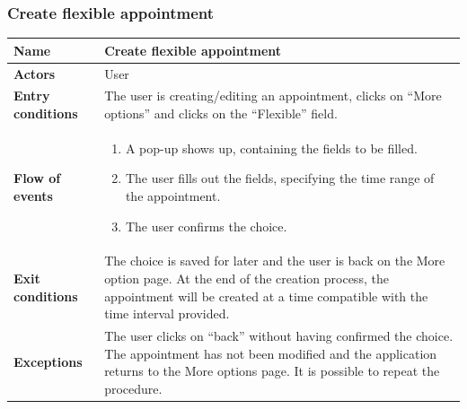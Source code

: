 \subsubsection{Create flexible appointment}
\begin{table}[!h]
	\centering
	{\renewcommand{\arraystretch}{2}%
		\begin{tabular}{|l|p{12cm}|}
			\hline
			\textbf{Name} 				& \textbf{Create flexible appointment} \\ \hline
			\textbf{Actors} 			& User \\ \hline
			\textbf{Entry conditions} 	& The user is creating/editing an appointment, clicks on “More options” and clicks on the “Flexible” field. \\ \hline
			\textbf{Flow of events}		& \begin{minipage}[t]{0.75\textwidth}
				\begin{enumerate}
					\item A pop-up shows up, containing the fields to be filled.
					\item The user fills out the fields, specifying the time range of the appointment.
					\item The user confirms the choice.
				\end{enumerate}
			\end{minipage}	\\ \hline
			\textbf{Exit conditions}	& The choice is saved for later and the user is back on the More option page. At the end of the creation process, the appointment will be created at a time compatible with the time interval provided.  \\ \hline
			\textbf{Exceptions}			& The user clicks on “back” without having confirmed the choice. The appointment has not been modified and the application returns to the More options page. It is possible to repeat the procedure.  \\ \hline
	\end{tabular}}
\end{table}

